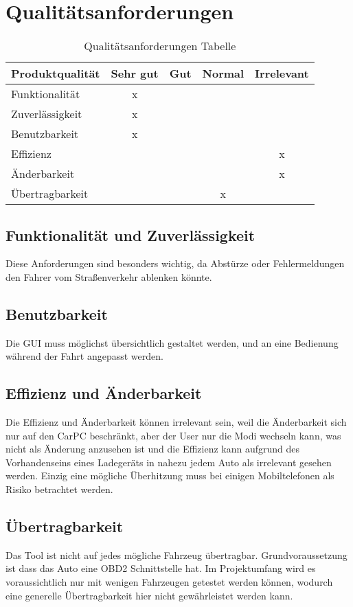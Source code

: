 \newline
\chapter{Qualitätsanforderungen}
\begin{table}[!htb]
\centering
\caption{Qualitätsanforderungen Tabelle}
\label{q-anforderungen}
\begin{tabular}{|l|c|c|c|c|}
\hline
Produktqualität & Sehr gut &   Gut   & Normal & Irrelevant \\ \hline
Funktionalität & x &  &  &  \\ \hline
Zuverlässigkeit & x &  &  &  \\ \hline
Benutzbarkeit & x &  &  &  \\ \hline
Effizienz &  &  &  & x \\ \hline
Änderbarkeit &  &  &  & x \\ \hline
Übertragbarkeit &  &  & x &  \\ \hline
\end{tabular}
\end{table}

\section{Funktionalität und Zuverlässigkeit}
Diese Anforderungen sind besonders wichtig, da Abstürze oder Fehlermeldungen den Fahrer vom Straßenverkehr ablenken könnte.

\section{Benutzbarkeit}
Die GUI muss möglichst übersichtlich gestaltet werden, und an eine Bedienung während der Fahrt angepasst werden.

\section{Effizienz und Änderbarkeit}
Die Effizienz und Änderbarkeit können irrelevant sein, weil die Änderbarkeit sich nur auf den CarPC beschränkt, aber der User nur die Modi wechseln kann, was nicht als Änderung anzusehen ist und die Effizienz kann aufgrund des Vorhandenseins eines Ladegeräts in nahezu jedem Auto als irrelevant gesehen werden. Einzig eine mögliche Überhitzung muss bei einigen Mobiltelefonen als Risiko betrachtet werden.

\section{Übertragbarkeit}
Das Tool ist nicht auf jedes mögliche Fahrzeug übertragbar. Grundvoraussetzung ist dass das Auto eine OBD2 Schnittstelle hat. Im Projektumfang wird es voraussichtlich nur mit wenigen Fahrzeugen getestet werden können, wodurch eine generelle Übertragbarkeit hier nicht gewährleistet werden kann.